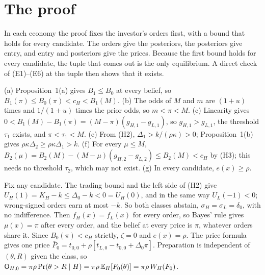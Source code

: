 \section{The proof}\label{sec:ccc-proof}

\begin{keyidea}
In each economy the proof fixes the investor's orders first, with a bound that holds for every candidate. The
orders give the posteriors, the posteriors give entry, and entry and posteriors give the prices. Because the first
bound holds for every candidate, the tuple that comes out is the only equilibrium. A direct check of (E1)--(E6) at
the tuple then shows that it exists.
\end{keyidea}

\begin{derivation}
(a) Proposition~1(a) gives \(B_1\le B_0\) at every belief, so \(B_1(\pi)\le B_0(\pi)<c_H<B_1(M)\).
(b) The odds of \(M\) and \(m\) are \((1+u)\) times and \(1/(1+u)\) times the prior odds, so \(m<\pi<M\).
(c) Linearity gives \(0<B_1(M)-B_1(\pi)=(M-\pi)(g_{H,1}-g_{L,1})\), so \(g_{H,1}>g_{L,1}\), the threshold \(\tau_1\) exists, and \(\pi<\tau_1<M\).
(e) From (H2), \(\Delta_1>k/(\rho\kappa)>0\); Proposition~1(b) gives \(\rho\kappa\Delta_2\ge\rho\kappa\Delta_1>k\).
(f) For every \(\mu\le M\), \(B_2(\mu)=B_2(M)-(M-\mu)(g_{H,2}-g_{L,2})\le B_2(M)<c_H\) by (H3); this needs no
threshold \(\tau_2\), which may not exist.
(g) In every candidate, \(e(x)\ge\rho\).
\end{derivation}

\begin{derivation}
Fix any candidate. The trading bound and the left side of (H2) give \(U_H(1)=K_H-k\le\Delta_0-k<0=U_H(0)\),
and in the same way \(U_L(-1)<0\); wrong-signed orders earn at most \(-k\). So both classes abstain,
\(\sigma_H=\sigma_L=\delta_0\), with no indifference. Then \(f_H(x)=f_L(x)\) for every order, so Bayes' rule gives
\(\mu(x)=\pi\) after every order, and the belief at every price is \(\pi\), whatever orders share it. Since
\(B_0(\pi)<c_H\) strictly, \(\zeta=0\) and \(e(x)=\rho\). The price formula gives one price
\(\bar P_0=t_{0,0}+\rho[t_{L,0}-t_{0,0}+\Delta_0\pi]\). Preparation is independent of \((\theta,R)\) given the
class, so \(\mathsf{O}_{H,0}=\pi\rho\Pr(\theta>R\mid H)=\pi\rho\,\mathbb{E}_H[F_0(\theta)]=\pi\rho\,W_H(F_0)\).
\end{derivation}

